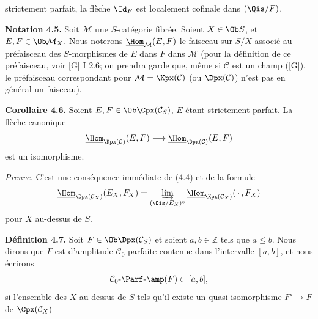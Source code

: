 strictement parfait, la flèche \(\Id_F\) est localement cofinale dans \((\Qis/F)\).

\textbf{Notation 4.5.} Soit \(\mathcal M\) une \(S\)-catégorie fibrée. Soient \(X\in\Ob S\), et \(E,F\in\Ob\mathcal M_X\). Nous noterons \(\underline{\Hom}_{\mathcal M}(E,F)\) le faisceau sur \(S/X\) associé au préfaisceau des \(S\)-morphismes de \(E\) dans \(F\) dans \(\mathcal M\) (pour la définition de ce préfaisceau, voir [G] I 2.6; on prendra garde que, même si \(\mathcal C\) est un champ ([G]), le préfaisceau correspondant pour \(\mathcal M=\Kpx(\mathcal C)\) (ou \(\Dpx(\mathcal C)\)) n'est pas en général un faisceau).

\textbf{Corollaire 4.6.} Soient \(E,F\in\Ob\Cpx(\mathcal C_S)\), \(E\) étant strictement parfait. La flèche canonique
\[
  \underline{\Hom}_{\Kpx(\mathcal C)}(E,F)
  \longrightarrow
  \underline{\Hom}_{\Dpx(\mathcal C)}(E,F)
\]
est un isomorphisme.

\emph{Preuve.} C'est une conséquence immédiate de (4.4) et de la formule
\[
  \underline{\Hom}_{\Dpx(\mathcal C_X)}(E_X,F_X)
  = \varinjlim_{(\Qis/E_X)^\circ}\underline{\Hom}_{\Kpx(\mathcal C_X)}(\,\cdot\,,F_X)
\]
pour \(X\) au-dessus de \(S\).

\textbf{Définition 4.7.} Soit \(F\in\Ob\Dpx(\mathcal C_S)\) et soient \(a,b\in\mathbb Z\) tels que \(a\leq b\). Nous dirons que \(F\) est d'amplitude \(\mathcal C_0\)-parfaite contenue dans l'intervalle \([a,b]\), et nous écrirons
\[
  \mathcal C_0\text{-}\Parf\text{-}\amp(F)\subset[a,b],
\]
si l'ensemble des \(X\) au-dessus de \(S\) tels qu'il existe un quasi-isomorphisme \(F'\to F\) de \(\Cpx(\mathcal C_X)\)
